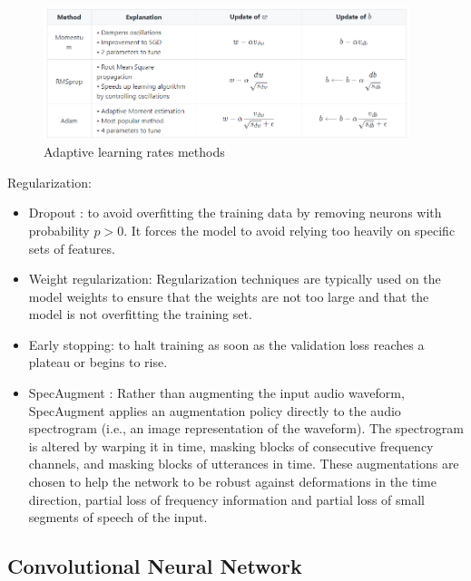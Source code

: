 \begin{figure}[!h]
    \centering
    \includegraphics[width=0.95\textwidth]{figures/adaptiveLR.PNG}
    \caption{Adaptive learning rates methods \cite{amidi2018deep}}
    \label{adaptiveLR}
\end{figure}

Regularization:

\begin{itemize}
    \item[] Dropout \cite{dropout}: to avoid overfitting the training data by removing neurons with probability $p > 0$. 
    It forces the model to avoid relying too heavily on specific sets of features.
    \item[] Weight regularization: Regularization techniques are typically used on the model weights to ensure that the weights are not too large and that the model is not overfitting the training set.
    \item[] Early stopping: to halt training as soon as the validation loss reaches a plateau or begins to rise.
    \item[] SpecAugment \cite{park2019specaugment}: Rather than augmenting the input audio waveform, SpecAugment applies an augmentation policy directly to the audio spectrogram (i.e., an image representation of the waveform).
    The spectrogram is altered by warping it in time, masking blocks of consecutive frequency channels, and masking blocks of utterances in time.
    These augmentations are chosen to help the network to be robust against deformations in the time direction, partial loss of frequency information and partial loss of small segments of speech of the input.
\end{itemize}


\subsection{Convolutional Neural Network}

